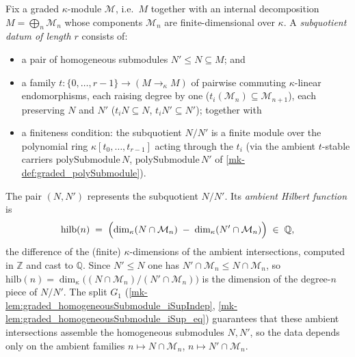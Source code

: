 \begin{definition}\label{mk-def:graded_subquotientHilb}
  \leanok



  Fix a graded \(\kappa\)-module \(\mathcal{M}\), i.e.\ \(M\) together with an
  internal decomposition \(M = \bigoplus_n \mathcal{M}_n\) whose components
  \(\mathcal{M}_n\) are finite-dimensional over \(\kappa\). A \emph{subquotient
  datum of length \(r\)} consists of:
  \begin{itemize}
    \item a pair of homogeneous submodules \(N' \le N \subseteq M\); and
    \item a family \(t : \{0, \dots, r-1\} \to (M \to_\kappa M)\) of pairwise
      commuting \(\kappa\)-linear endomorphisms, each raising degree by one
      (\(t_i(\mathcal{M}_n) \subseteq \mathcal{M}_{n+1}\)), each preserving \(N\)
      and \(N'\) (\(t_i N \subseteq N\), \(t_i N' \subseteq N'\)); together with
    \item a finiteness condition: the subquotient \(N/N'\) is a finite module over the
      polynomial ring \(\kappa[t_0, \dots, t_{r-1}]\) acting through the \(t_i\) (via the
      ambient \(t\)-stable carriers \(\mathrm{polySubmodule}\,N\),
      \(\mathrm{polySubmodule}\,N'\) of \ref{mk-def:graded_polySubmodule}).
  \end{itemize}
  The pair \((N, N')\) represents the subquotient \(N/N'\). Its \emph{ambient
  Hilbert function} is
  \[
    \mathrm{hilb}(n) \;=\; \Bigl(\dim_\kappa (N \cap \mathcal{M}_n)
      \;-\; \dim_\kappa (N' \cap \mathcal{M}_n)\Bigr) \;\in\; \mathbb{Q},
  \]
  the difference of the (finite) \(\kappa\)-dimensions of the ambient intersections,
  computed in \(\mathbb{Z}\) and cast to \(\mathbb{Q}\). Since \(N' \le N\) one has
  \(N' \cap \mathcal{M}_n \le N \cap \mathcal{M}_n\), so
  \(\mathrm{hilb}(n) = \dim_\kappa\bigl((N \cap \mathcal{M}_n)/(N' \cap \mathcal{M}_n)\bigr)\)
  is the dimension of the degree-\(n\) piece of \(N/N'\). The split \(G_1\)
  (\ref{mk-lem:graded_homogeneousSubmodule_iSupIndep},
  \ref{mk-lem:graded_homogeneousSubmodule_iSup_eq}) guarantees that these ambient
  intersections assemble the homogeneous submodules \(N, N'\), so the data depends
  only on the ambient families \(n \mapsto N \cap \mathcal{M}_n\),
  \(n \mapsto N' \cap \mathcal{M}_n\).
\end{definition}

